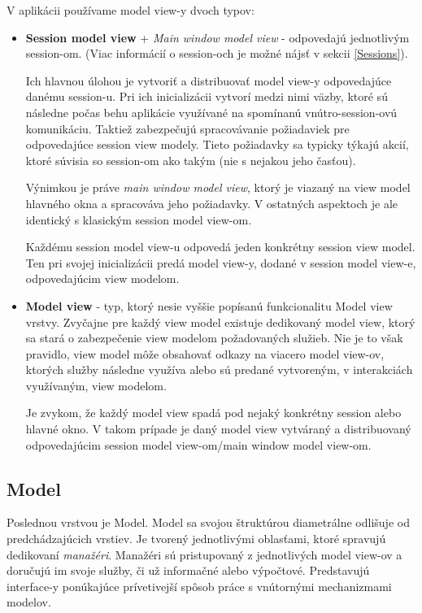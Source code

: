 V aplikácii používame model view-y dvoch typov:
\begin{itemize}
    \item \textbf{Session model view} + \textit{Main window model view}  - odpovedajú jednotlivým session-om. (Viac informácií o session-och je možné nájsť v sekcii \ref{Sessions}). 
    
    Ich hlavnou úlohou je vytvoriť a distribuovať model view-y odpovedajúce danému session-u. Pri ich inicializácii vytvorí medzi nimi väzby, ktoré sú následne počas behu aplikácie využívané na spomínanú vnútro-session-ovú komunikáciu. Taktiež zabezpečujú spracovávanie požiadaviek pre odpovedajúce session view modely. Tieto požiadavky sa typicky týkajú akcií, ktoré súvisia so session-om ako takým (nie s nejakou jeho časťou).  
    
    Výnimkou je práve \textit{main window model view}, ktorý je viazaný na view model hlavného okna a spracováva jeho požiadavky. V ostatných aspektoch je ale identický s klasickým session model view-om.
    
    Každému session model view-u odpovedá jeden konkrétny session view model. Ten pri svojej inicializácii predá model view-y, dodané v session model view-e, odpovedajúcim view modelom.   
    \item \textbf{Model view} - typ, ktorý nesie vyššie popísanú funkcionalitu Model view vrstvy. Zvyčajne pre každý view model existuje dedikovaný model view, ktorý sa stará o zabezpečenie view modelom požadovaných služieb. Nie je to však pravidlo, view model môže obsahovať odkazy na viacero model view-ov, ktorých služby následne využíva alebo sú predané vytvoreným, v interakciách využívaným, view modelom.

    Je zvykom, že každý model view spadá pod nejaký konkrétny session alebo hlavné okno. V takom prípade je daný model view vytváraný a distribuovaný odpovedajúcim session model view-om/main window model view-om.  
\end{itemize}

\subsection{Model}

Poslednou  vrstvou je Model. Model sa svojou štruktúrou diametrálne odlišuje od predchádzajúcich vrstiev. Je tvorený jednotlivými oblasťami, ktoré spravujú dedikovaní \textit{manažéri}. Manažéri sú pristupovaný z jednotlivých model view-ov a doručujú im svoje služby, či už informačné alebo výpočtové. Predstavujú interface-y ponúkajúce prívetivejší spôsob práce s vnútornými mechanizmami modelov. 


